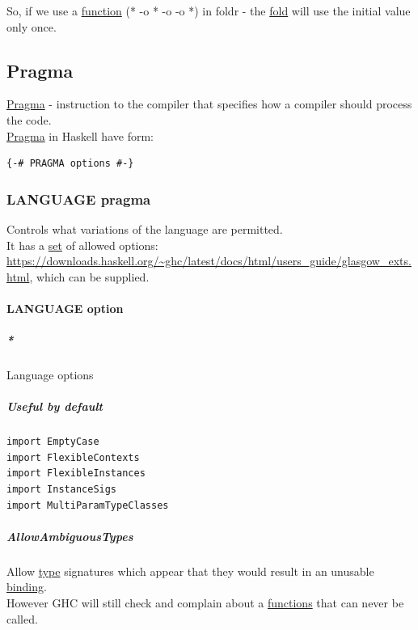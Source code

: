 \documentclass[11pt]{article}
\begin{document}
So, if we use a \hyperref[orge15bc14]{function} (* -o * -o -o *) in foldr - the \hyperref[org2e54a0f]{fold} will use the initial value only once.\\

\subsection{\label{org7a83f5d}Pragma}
\label{sec:org26aea94}
\hyperref[org7a83f5d]{Pragma} - instruction to the compiler that specifies how a compiler should process the code.\\
\hyperref[org7a83f5d]{Pragma} in Haskell have form:\\
\begin{verbatim}
{-# PRAGMA options #-}
\end{verbatim}

\subsubsection{\label{orgc3b3746}LANGUAGE pragma}
\label{sec:org37c5972}
Controls what variations of the language are permitted.\\
It has a \hyperref[org1faf06d]{set} of allowed options: \url{https://downloads.haskell.org/\~ghc/latest/docs/html/users\_guide/glasgow\_exts.html}, which can be supplied.\\

\paragraph{\label{orgc822b41}LANGUAGE option}
\label{sec:org29e80f8}

\subparagraph{\emph{*}}
\label{sec:org13d31d4}

\label{org77b1d95}Language options\\

\subparagraph{Useful by default}
\label{sec:org5ba6fd4}
\begin{verbatim}
import EmptyCase
import FlexibleContexts
import FlexibleInstances
import InstanceSigs
import MultiParamTypeClasses
\end{verbatim}

\subparagraph{\label{org29739e6}AllowAmbiguousTypes}
\label{sec:org761bab8}
Allow \hyperref[orgc4aea2f]{type} signatures which appear that they would result in an unusable \hyperref[org6b75da3]{binding}.\\
However GHC will still check and complain about a \hyperref[orgaa8fb87]{functions} that can never be called.\\
\end{document}
